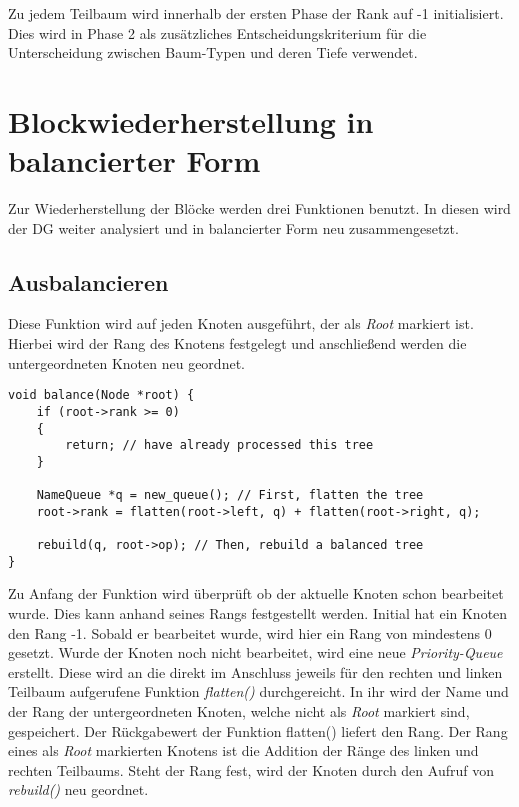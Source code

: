 Zu jedem Teilbaum wird innerhalb der ersten Phase der Rank auf -1 initialisiert. Dies wird in Phase 2 als zusätzliches Entscheidungskriterium für die  Unterscheidung zwischen Baum-Typen und deren Tiefe verwendet.

\section{Blockwiederherstellung in balancierter Form}
Zur Wiederherstellung der Blöcke werden drei Funktionen benutzt. In diesen wird der \ac{DG} weiter analysiert und in balancierter Form neu zusammengesetzt.

\subsection{Ausbalancieren}
Diese Funktion wird auf jeden Knoten ausgeführt, der als \textit{Root} markiert ist. Hierbei wird der Rang des Knotens festgelegt und anschließend werden die untergeordneten Knoten neu geordnet.\\

\begin{lstlisting}[caption=Funktion balance(), label=list:Funktion balace()]
void balance(Node *root) {
	if (root->rank >= 0)
	{
		return; // have already processed this tree
	}

	NameQueue *q = new_queue(); // First, flatten the tree
	root->rank = flatten(root->left, q) + flatten(root->right, q);

	rebuild(q, root->op); // Then, rebuild a balanced tree
}
\end{lstlisting}

Zu Anfang der Funktion wird überprüft ob der aktuelle Knoten schon bearbeitet wurde. Dies kann anhand seines Rangs festgestellt werden. Initial hat ein Knoten den Rang -1. Sobald er bearbeitet wurde, wird hier ein Rang von mindestens 0 gesetzt. Wurde der Knoten noch nicht bearbeitet, wird eine neue \textit{Priority-Queue} erstellt. Diese wird an die direkt im Anschluss jeweils für den rechten und linken Teilbaum aufgerufene Funktion \textit{flatten()} durchgereicht. In ihr wird der Name und der Rang der untergeordneten Knoten, welche nicht als \textit{Root} markiert sind, gespeichert. Der Rückgabewert der Funktion flatten() liefert den Rang. Der Rang eines als \textit{Root} markierten Knotens ist die Addition der Ränge des linken und rechten Teilbaums. Steht der Rang fest, wird der Knoten durch den Aufruf von \textit{rebuild()} neu geordnet.

